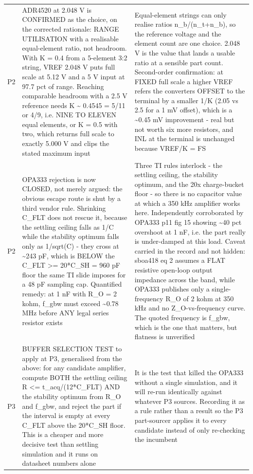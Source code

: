 \documentclass[11pt,a4paper]{article}
\begin{document}
{\begin{longtable}{lp{5.2cm}p{7.2cm}}
P2 & ADR4520 at 2.048 V is CONFIRMED as the choice, on the corrected rationale: RANGE UTILISATION with a realisable equal-element ratio, not headroom. With K = 0.4 from a 5-element 3:2 string, VREF 2.048 V puts full scale at 5.12 V and a 5 V input at 97.7 pct of range. Reaching comparable headroom with a 2.5 V reference needs K \textasciitilde{} 0.4545 = 5/11 or 4/9, i.e. NINE TO ELEVEN equal elements, or K = 0.5 with two, which returns full scale to exactly 5.000 V and clips the stated maximum input & Equal-element strings can only realise ratios n\_b/(n\_t+n\_b), so the reference voltage and the element count are one choice. 2.048 V is the value that lands a usable ratio at a sensible part count. Second-order confirmation: at FIXED full scale a higher VREF refers the converters OFFSET to the terminal by a smaller 1/K (2.05 vs 2.5 for a 1 mV offset), which is a \textasciitilde{}0.45 mV improvement - real but not worth six more resistors, and INL at the terminal is unchanged because VREF/K = FS \\
P2 & OPA333 rejection is now CLOSED, not merely argued: the obvious escape route is shut by a third vendor rule. Shrinking C\_FLT does not rescue it, because the settling ceiling falls as 1/C while the stability optimum falls only as 1/sqrt(C) - they cross at \textasciitilde{}243 pF, which is BELOW the C\_FLT \textgreater{}= 20{*}C\_SH = 960 pF floor the same TI slide imposes for a 48 pF sampling cap. Quantified remedy: at 1 nF with R\_O = 2 kohm, f\_gbw must exceed \textasciitilde{}0.78 MHz before ANY legal series resistor exists & Three TI rules interlock - the settling ceiling, the stability optimum, and the 20x charge-bucket floor - so there is no capacitor value at which a 350 kHz amplifier works here. Independently corroborated by OPA333 p11 fig 15 showing \textasciitilde{}40 pct overshoot at 1 nF, i.e. the part really is under-damped at this load. Caveat carried in the record and not hidden: sboa418 eq 2 assumes a FLAT resistive open-loop output impedance across the band, while OPA333 publishes only a single-frequency R\_O of 2 kohm at 350 kHz and no Z\_O-vs-frequency curve. The quoted frequency is f\_gbw, which is the one that matters, but flatness is unverified \\
P3 & BUFFER SELECTION TEST to apply at P3, generalised from the above: for any candidate amplifier, compute BOTH the settling ceiling R \textless{}= t\_acq/(12{*}C\_FLT) AND the stability optimum from R\_O and f\_gbw, and reject the part if the interval is empty at every C\_FLT above the 20{*}C\_SH floor. This is a cheaper and more decisive test than settling simulation and it runs on datasheet numbers alone & It is the test that killed the OPA333 without a single simulation, and it will re-run identically against whatever P3 sources. Recording it as a rule rather than a result so the P3 part-sourcer applies it to every candidate instead of only re-checking the incumbent \\

\end{longtable}}
\end{document}
